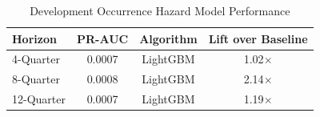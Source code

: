 \begin{table}[H]
\centering
\caption{Development Occurrence Hazard Model Performance}
\label{tab:stagea_limits}
\begin{tabular}{lccc}
\toprule
\textbf{Horizon} & \textbf{PR-AUC} & \textbf{Algorithm} & \textbf{Lift over Baseline} \\
\midrule
4-Quarter & 0.0007 & LightGBM & 1.02$\times$ \\
8-Quarter & 0.0008 & LightGBM & 2.14$\times$ \\
12-Quarter & 0.0007 & LightGBM & 1.19$\times$ \\
\bottomrule
\end{tabular}

\end{table}
